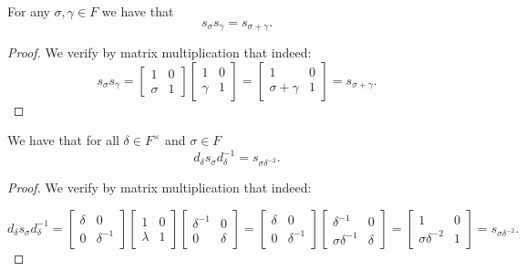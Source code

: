 \begin{lemma}
\label{SpecialMatrices.s_mul_s_eq_s_add}
\leanok
    For any $\sigma, \gamma \in F$ we have that
    \[
    s_\sigma s_\gamma = s_{\sigma + \gamma}.
    \]
\end{lemma}
\begin{proof}
    We verify by matrix multiplication that indeed:
\begin{equation*}
    s_\sigma s_\gamma = \begin{bmatrix} 1 & 0 \\ \sigma & 1 \end{bmatrix} \begin{bmatrix} 1 & 0 \\ \gamma & 1 \end{bmatrix} = \begin{bmatrix} 1 & 0 \\ \sigma + \gamma & 1 \end{bmatrix} = s_{\sigma + \gamma}.
\end{equation*}
\end{proof}

\begin{lemma}
\label{SpecialMatrices.d_mul_s_mul_d_inv_eq_s}
    We have that for all $\delta \in F^\times$ and $\sigma \in F$
    \[
    d_\delta s_\sigma d^{-1}_\delta = s_{\sigma \delta^{-2}}.
    \]
\end{lemma}
\begin{proof}
    We verify by matrix multiplication that indeed:

    \begin{equation*}
        d_\delta s_\sigma d^{-1}_\delta = \! \begin{bmatrix} \delta & 0 \\ 0 & \delta^{-1} \end{bmatrix} \begin{bmatrix} 1 & 0 \\ \lambda & 1 \end{bmatrix} \begin{bmatrix} \delta^{-1} & 0 \\ 0 & \delta \end{bmatrix} = \begin{bmatrix} \delta & 0 \\ 0 & \delta^{-1} \end{bmatrix} \! \begin{bmatrix} \delta^{-1} & 0 \\ \sigma \delta^{-1} & \delta \end{bmatrix} \! = \! \begin{bmatrix} 1 & 0 \\ \sigma \delta^{-2} & 1 \end{bmatrix} \! = s_{\sigma \delta^{-2}}.
    \end{equation*}
\end{proof}

